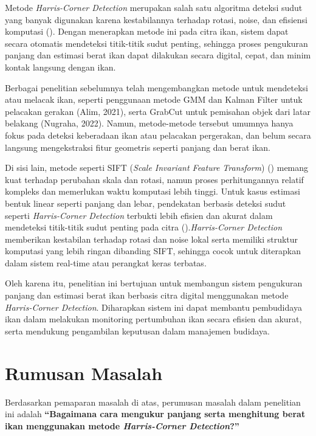 Metode \emph{Harris-Corner Detection} merupakan salah satu algoritma deteksi sudut yang banyak digunakan karena kestabilannya terhadap rotasi, noise, dan efisiensi komputasi (\cite{Harris2013}). Dengan menerapkan metode ini pada citra ikan, sistem dapat secara otomatis mendeteksi titik-titik sudut penting, sehingga proses pengukuran panjang dan estimasi berat ikan dapat dilakukan secara digital, cepat, dan minim kontak langsung dengan ikan.

Berbagai penelitian sebelumnya telah mengembangkan metode untuk mendeteksi atau melacak ikan, seperti penggunaan metode GMM dan Kalman Filter untuk pelacakan gerakan (Alim, 2021), serta GrabCut untuk pemisahan objek dari latar belakang (Nugraha, 2022). Namun, metode-metode tersebut umumnya hanya fokus pada deteksi keberadaan ikan atau pelacakan pergerakan, dan belum secara langsung mengekstraksi fitur geometris seperti panjang dan berat ikan.

Di sisi lain, metode seperti SIFT (\emph{Scale Invariant Feature Transform}) (\cite{Lowe2004}) memang kuat terhadap perubahan skala dan rotasi, namun proses perhitungannya relatif kompleks dan memerlukan waktu komputasi lebih tinggi. Untuk kasus estimasi bentuk linear seperti panjang dan lebar, pendekatan berbasis deteksi sudut seperti \emph{Harris-Corner Detection} terbukti lebih efisien dan akurat dalam mendeteksi titik-titik sudut penting pada citra (\cite{Harris2013}).\emph{Harris-Corner Detection} memberikan kestabilan terhadap rotasi dan noise lokal serta memiliki struktur komputasi yang lebih ringan dibanding SIFT, sehingga cocok untuk diterapkan dalam sistem real-time atau perangkat keras terbatas.

Oleh karena itu, penelitian ini bertujuan untuk membangun sistem pengukuran panjang dan estimasi berat ikan berbasis citra digital menggunakan metode \emph{Harris-Corner Detection}. Diharapkan sistem ini dapat membantu pembudidaya ikan dalam melakukan monitoring pertumbuhan ikan secara efisien dan akurat, serta mendukung pengambilan keputusan dalam manajemen budidaya.

\section{Rumusan Masalah}
Berdasarkan pemaparan masalah di atas, perumusan masalah dalam penelitian ini adalah \textbf{“Bagaimana cara mengukur panjang serta menghitung berat ikan menggunakan metode \emph{Harris-Corner Detection}?”}

